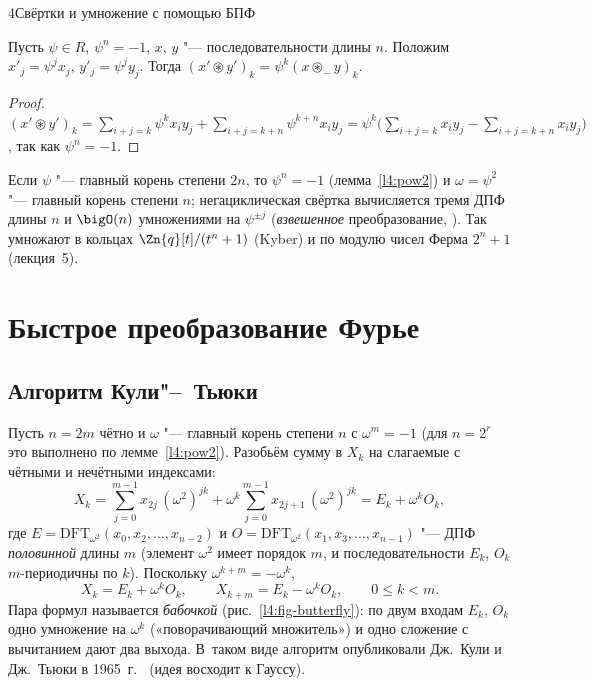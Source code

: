 \begin{lecture}{4}{Свёртки и умножение с помощью БПФ}
\begin{proposition}\label{l4:dwt}
Пусть $\psi \in R$, $\psi^n = -1$, $x$, $y$ "--- последовательности длины $n$. Положим
$x'_j = \psi^j x_j$, $y'_j = \psi^j y_j$. Тогда $(x' \circledast y')_k = \psi^k (x \circledast_{-} y)_k$.
\end{proposition}

\begin{proof}
$(x' \circledast y')_k = \sum_{i+j=k} \psi^{k} x_i y_j + \sum_{i+j=k+n} \psi^{k+n} x_i y_j
= \psi^k \bigl(\sum_{i+j=k} x_i y_j - \sum_{i+j=k+n} x_i y_j\bigr)$, так как $\psi^n = -1$.
\end{proof}

Если $\psi$ "--- главный корень степени $2n$, то $\psi^n = -1$ (лемма~\ref{l4:pow2}) и
$\omega = \psi^2$ "--- главный корень степени $n$; негациклическая свёртка вычисляется тремя ДПФ
длины $n$ и $\bigO(n)$ умножениями на $\psi^{\pm j}$ (\emph{взвешенное} преобразование,
\cite[разд.~9.5.4]{crandall-pomerance}). Так умножают в кольцах $\Zn{q}[t]/(t^n + 1)$ (Kyber) и
по модулю чисел Ферма $2^n + 1$ (лекция~5).



\section{Быстрое преобразование Фурье}

\subsection{Алгоритм Кули"--~Тьюки}

Пусть $n = 2m$ чётно и $\omega$ "--- главный корень степени $n$ с $\omega^{m} = -1$ (для
$n = 2^r$ это выполнено по лемме~\ref{l4:pow2}). Разобьём сумму в $X_k$ на слагаемые с чётными
и нечётными индексами:
\[
  X_k = \sum_{j=0}^{m-1} x_{2j}\, (\omega^2)^{jk} + \omega^k \sum_{j=0}^{m-1} x_{2j+1}\, (\omega^2)^{jk}
  = E_k + \omega^k O_k,
\]
где $E = \mathrm{DFT}_{\omega^2}(x_0, x_2, \dots, x_{n-2})$ и
$O = \mathrm{DFT}_{\omega^2}(x_1, x_3, \dots, x_{n-1})$ "--- ДПФ \emph{половинной} длины $m$
(элемент $\omega^2$ имеет порядок $m$, и последовательности $E_k$, $O_k$ $m$-периодичны по $k$).
Поскольку $\omega^{k + m} = -\omega^k$,
\[
  \boxed{\;X_k = E_k + \omega^k O_k, \qquad X_{k+m} = E_k - \omega^k O_k, \qquad 0 \le k < m.\;}
\]
Пара формул называется \emph{бабочкой} (рис.~\ref{l4:fig-butterfly}): по двум входам $E_k$, $O_k$
одно умножение на $\omega^k$ («поворачивающий множитель») и одно сложение с вычитанием дают
два выхода. В~таком виде алгоритм опубликовали Дж.~Кули и Дж.~Тьюки в 1965~г.~\cite{cooley-tukey}
(идея восходит к Гауссу).


\end{lecture}
